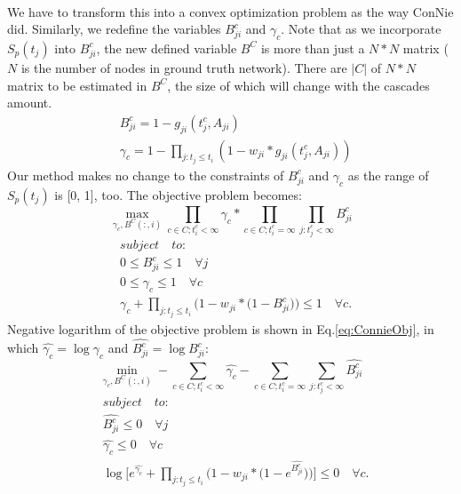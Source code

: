 \begin{itemize}
\begin{equation}
\begin{aligned}
\end{aligned}
\end{equation}
We have to transform this into a convex optimization problem as the way ConNie did. Similarly, we redefine the variables $B_{ji}^c$ and $\gamma_c$. Note that as we incorporate $S_p(t_j)$ into $B_{ji}^c$, the new defined variable $B^C$ is more than just a $N*N$ matrix ($N$ is the number of nodes in ground truth network). There are $|C|$ of $N*N$ matrix to be estimated in $B^C$, the size of which will change with the cascades amount.
\begin{eqnarray} 
&B_{ji}^c=1-g_{ji}(t_j^c,A_{ji})\\
&\gamma_c=1-\prod_{j:t_j \leq t_i}(1-w_{ji}\ast g_{ji}(t_j^c,A_{ji})) \label{eq:ConnieGamma}
\end{eqnarray}
Our method makes no change to the constraints of $B_{ji}^c$ and $\gamma_c$ as the range of $S_p(t_j)$ is [0, 1], too. The objective problem becomes:
\begin{equation}
\max_{\gamma_c,B^C(:,i)}\prod_{c\in C;t_i^c<\infty} \gamma_c \ast \prod_{c\in C;t_i^c=\infty} \prod_{j:t_j^c<\infty}B_{ji}^c 
\end{equation}
\begin{eqnarray}
& subject \quad to:\nonumber \\
& 0 \leqslant B_{ji}^c \leqslant 1 \quad \forall j \nonumber \\
& 0 \leqslant \gamma_c \leqslant 1 \quad \forall c \nonumber \\
& \gamma_c+\prod_{j:t_j \leq t_i}\bigg(1-w_{ji}\ast \big(1-B_{ji}^c\big)\bigg) \leqslant 1 \quad \forall c. \nonumber 
\end{eqnarray}
Negative logarithm of the objective problem is shown in Eq.\ref{eq:ConnieObj}, in which $\hat{\gamma_c}=\log{\gamma_c}$ and $\hat{B_{ji}^c}=\log{B_{ji}^c}$:
\begin{equation}\label{eq:ConnieObj}
\min_{\gamma_c,B^C(:,i)}-\sum_{c\in C;t_i^c<\infty} \hat{\gamma_c} - \sum_{c\in C;t_i^c=\infty} \sum_{j:t_j^c<\infty}\hat{B_{ji}^c} 
\end{equation}
\begin{eqnarray}
& subject \quad to:\nonumber \\
& \hat{B_{ji}^c} \leqslant 0 \quad \forall j \nonumber \\
& \hat{\gamma_c} \leqslant 0 \quad \forall c \nonumber \\
& \log{\bigg[e^{\hat{\gamma_c}}+\prod_{j:t_j \leq t_i}\bigg(1-w_{ji}\ast \big(1- e^{\hat{B_{ji}^c}} \big)\bigg) \bigg] \leqslant 0} \quad \forall c. \nonumber 

\end{eqnarray}
\end{itemize}

